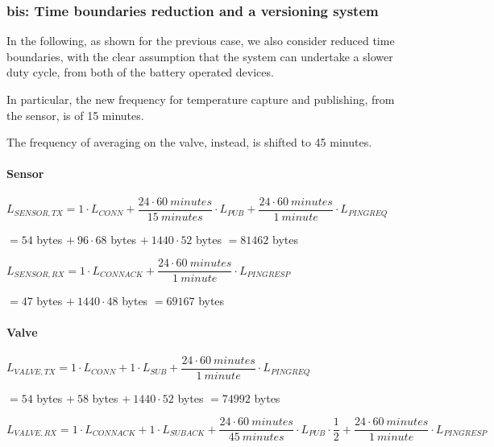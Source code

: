 \documentclass[a4paper,11pt]{article} %
\begin{document}
    \subsubsection{bis: Time boundaries reduction and a versioning system}

    In the following, as shown for the previous case, we also consider reduced time boundaries, with the clear assumption that the system can undertake a slower duty cycle, from both of the battery operated devices.

    In particular, the new frequency for temperature capture and publishing, from the sensor, is of 15 minutes.

    The frequency of averaging on the valve, instead, is shifted to 45 minutes.

    \paragraph{Sensor}

    $L_{SENSOR, TX} = 1 \cdot L_{CONN} + \dfrac{24 \cdot 60\ minutes}{15\ minutes} \cdot L_{PUB} + \dfrac{24 \cdot 60\ minutes}{1\ minute} \cdot L_{PINGREQ}$

    \medskip

    \qquad \qquad \qquad $ = 54$ bytes $+\ 96 \cdot 68$ bytes $+\ 1440 \cdot 52$ bytes $ = 81462$ bytes

    \medskip

    $L_{SENSOR, RX} = 1 \cdot L_{CONNACK} + \dfrac{24 \cdot 60\ minutes}{1\ minute} \cdot L_{PINGRESP}$

    \medskip

    \qquad \qquad \qquad $= 47$ bytes $+\ 1440 \cdot 48$ bytes $ = 69167$ bytes

    \paragraph{Valve}

    $L_{VALVE, TX} = 1 \cdot L_{CONN} + 1 \cdot L_{SUB} + \dfrac{24 \cdot 60\ minutes}{1\ minute} \cdot L_{PINGREQ}$

    \medskip

    \qquad \qquad \qquad $= 54$ bytes $+\ 58$ bytes $+\ 1440 \cdot 52$ bytes $ = 74992$ bytes

    \medskip

    $L_{VALVE, RX} = 1 \cdot L_{CONNACK} + 1 \cdot L_{SUBACK} + \dfrac{24 \cdot 60\ minutes}{45\ minutes} \cdot L_{PUB} \cdot \dfrac{1}{2} + \dfrac{24 \cdot 60\ minutes}{1\ minute} \cdot L_{PINGRESP}$
\end{document}
